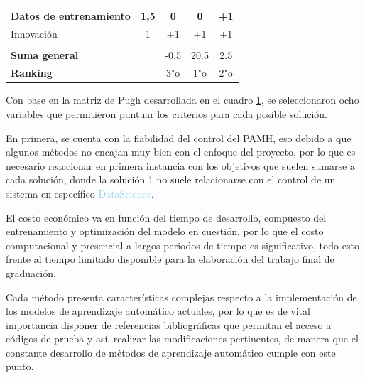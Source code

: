 \begin{table}[h]
\begin{tabular}{lcccc}
\multicolumn{1}{|l|}{Datos de entrenamiento} &
  \multicolumn{1}{c|}{1,5} &
  \multicolumn{1}{c|}{0} &
  \multicolumn{1}{c|}{0} &
  \multicolumn{1}{c|}{+1} \\ \hline
\multicolumn{1}{|l|}{Innovación} &
  \multicolumn{1}{c|}{1} &
  \multicolumn{1}{c|}{+1} &
  \multicolumn{1}{c|}{+1} &
  \multicolumn{1}{c|}{+1} \\ \hline
 &
  \multicolumn{1}{l}{} &
  \multicolumn{1}{l}{} &
  \multicolumn{1}{l}{} &
  \multicolumn{1}{l}{} \\ \cline{1-1} \cline{3-5} 
\multicolumn{1}{|l|}{\textbf{Suma general}} &
  \multicolumn{1}{c|}{} &
  \multicolumn{1}{c|}{-0.5} &
  \multicolumn{1}{c|}{20.5} &
  \multicolumn{1}{c|}{2.5} \\ \cline{1-1} \cline{3-5} 
\multicolumn{1}{|l|}{\textbf{Ranking}} &
  \multicolumn{1}{c|}{} &
  \multicolumn{1}{c|}{3"o} &
  \multicolumn{1}{c|}{1"o} &
  \multicolumn{1}{c|}{2"o} \\ \cline{1-1} \cline{3-5} 
\end{tabular}
\label{tab:MatrizPugh}
\end{table}


Con base en la matriz de Pugh desarrollada en el cuadro \ref{tab:MatrizPugh}, se seleccionaron ocho variables que permitieron puntuar los criterios para cada posible solución. 

En primera, se cuenta con la fiabilidad del control del PAMH, eso debido a que algunos métodos no encajan muy bien con el enfoque del proyecto, por lo que es necesario reaccionar en primera instancia con los objetivos que suelen sumarse a cada solución, donde la solución 1 no suele relacionarse con el control de un sistema en específico \textcolor{SkyBlue}{DataScience}.

El costo económico va en función del tiempo de desarrollo, compuesto del entrenamiento y optimización del modelo en cuestión, por lo que el costo computacional y presencial a largos periodos de tiempo es significativo, todo esto frente al tiempo limitado disponible para la elaboración del trabajo final de graduación. 

Cada método presenta características complejas respecto a la implementación de los modelos de aprendizaje automático actuales, por lo que es de vital importancia disponer de referencias bibliográficas que permitan el acceso a códigos de prueba y así, realizar las modificaciones pertinentes, de manera que el constante desarrollo de métodos de aprendizaje automático cumple con este punto.

